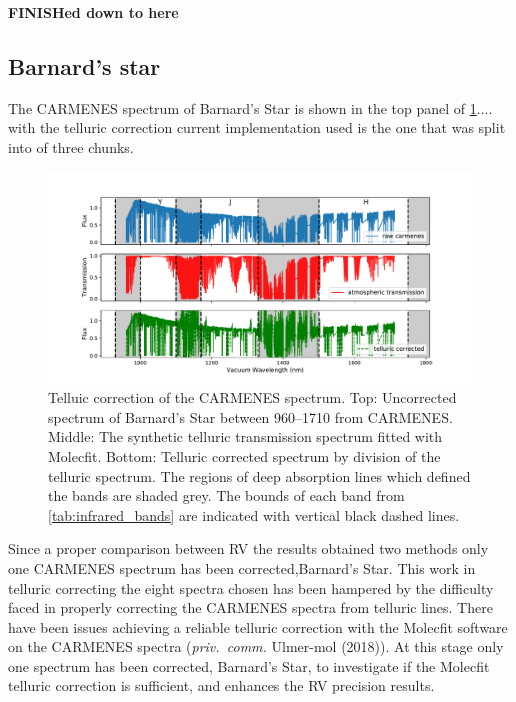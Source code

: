 \textbf{FINISHed down to here}

\subsection{Barnard's star}
\label{sec:carmenes_barnards_star}
The {CARMENES} spectrum of Barnard's Star is shown in the top panel of \cref{fig:carmenes_correction}....
with the telluric correction current implementation used is the one that was split into of three chunks.


\begin{figure}
    \centering
    \includegraphics[width=0.9\linewidth]{figures/information-content/Carmenes/telluric_correct_carmenes}
    \caption[Telluic correction of the {CARMENES} \nir{} spectrum.]{Telluic correction of the {CARMENES} \nir{} spectrum.
        Top: Uncorrected spectrum of Barnard's Star between 960--1710\nm{} from {CARMENES}.
        Middle: The synthetic telluric transmission spectrum fitted with {Molecfit}.
        Bottom: Telluric corrected spectrum by division of the telluric spectrum.
        The regions of deep  absorption lines which defined the \nir{} bands are shaded grey.
        The bounds of each band from \cref{tab:infrared_bands} are indicated with vertical black dashed lines.}
    \label{fig:carmenes_correction}
\end{figure}

Since a proper comparison between {RV} the results obtained two methods only one {CARMENES} spectrum has been corrected,Barnard's Star.
This work in telluric correcting the eight spectra chosen has been hampered by the difficulty faced in properly correcting the {CARMENES} spectra from telluric lines.
There have been issues achieving a reliable telluric correction with the {Molecfit} software on the {CARMENES} spectra (\emph{priv.\ comm.} Ulmer-mol (2018)).
At this stage only one spectrum has been corrected, Barnard's Star, to investigate if the {Molecfit} telluric correction is sufficient, and enhances the {RV} precision results.

